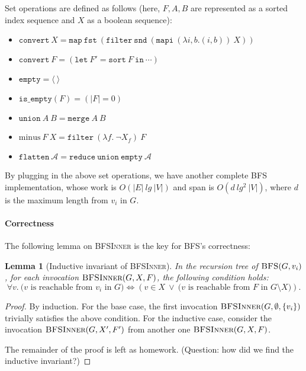 \documentclass[11pt,a4paper,oneside,microtype,chapter,nokorean]{oblivoir}
\newtheorem{lemma}[theorem]{Lemma}
\begin{document}
Set operations are defined as follows (here, $F,A,B$ are represented as a sorted index sequence and
$X$ as a boolean sequence):

\begin{itemize}
\item $\texttt{convert}~X = \texttt{map}~\texttt{fst}~(\texttt{filter}~\texttt{snd}~(\texttt{mapi}~(\lambda i,b. (i,b))~X))$
\item $\texttt{convert}~F = (\texttt{let}~F' = \texttt{sort}~F~\texttt{in}~\cdots)$
\item $\texttt{empty} = \langle~\rangle$
\item $\texttt{is\_empty}(F) = (|F| = 0)$
\item $\texttt{union}~A~B = \texttt{merge}~A~B$
\item $\textrm{minus}~F~X = \texttt{filter}~(\lambda f.~\neg X_f)~F$
\item $\texttt{flatten}~\mathcal{A} = \texttt{reduce}~\texttt{union}~\texttt{empty}~\mathcal{A}$
\end{itemize}

By plugging in the above set operations, we have another complete BFS implementation, whose work is
$O(|E|~lg~|V|)$ and span is $O(d~lg^2~|V|)$, where $d$ is the maximum length from $v_i$ in $G$.


\paragraph{Correctness} The following lemma on \textsc{BFSInner} is the key for BFS's correctness:

\begin{lemma}[Inductive invariant of \textsc{BFSInner}] In the recursion tree of
  $\textsc{BFS}(G,v_i)$, for each invocation $\textsc{BFSInner}(G,X,F)$, the following condition
  holds:
  \[ \forall v.~\mbox{($v$ is reachable from $v_i$ in $G$)} \iff (v \in X~\lor~\mbox{($v$ is
      reachable from $F$ in $G \setminus X$)}).
  \]  
\end{lemma}
\begin{proof}
  By induction.  For the base case, the first invocation $\textsc{BFSInner}(G,\emptyset,\{v_i\})$
  trivially satisfies the above condition.  For the inductive case, consider the invocation
  $\textsc{BFSInner}(G,X',F')$ from another one $\textsc{BFSInner}(G,X,F)$.

  The remainder of the proof is left as homework.  (Question: how did we find the inductive
  invariant?)
\end{proof}
\end{document}
